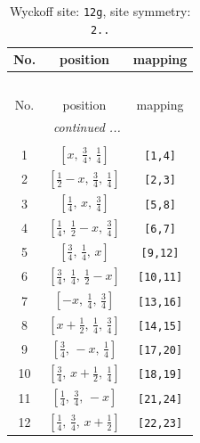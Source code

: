 \documentclass[fleqn,8pt]{jsarticle}
\begin{document}
\begin{longtable}{ccc}
\caption{Wyckoff site: {\tt 12g}, site symmetry: {\tt 2..}}
 \\
 \hline \hline
No. & position & mapping \\ \hline \endfirsthead

\multicolumn{2}{l}{\tablename\ \thetable{}} \\
 \hline \hline
No. & position & mapping \\ \hline \endhead

 \hline \hline
\multicolumn{2}{r}{\footnotesize\it continued ...} \\ \endfoot

 \hline \hline
\multicolumn{2}{r}{} \\ \endlastfoot

1 & $\left[ x,\, \frac{3}{4},\, \frac{1}{4} \right]$ & {\tt [1,4]} \\ \hline
2 & $\left[ \frac{1}{2} - x,\, \frac{3}{4},\, \frac{1}{4} \right]$ & {\tt [2,3]} \\ \hline
3 & $\left[ \frac{1}{4},\, x,\, \frac{3}{4} \right]$ & {\tt [5,8]} \\ \hline
4 & $\left[ \frac{1}{4},\, \frac{1}{2} - x,\, \frac{3}{4} \right]$ & {\tt [6,7]} \\ \hline
5 & $\left[ \frac{3}{4},\, \frac{1}{4},\, x \right]$ & {\tt [9,12]} \\ \hline
6 & $\left[ \frac{3}{4},\, \frac{1}{4},\, \frac{1}{2} - x \right]$ & {\tt [10,11]} \\ \hline
7 & $\left[ - x,\, \frac{1}{4},\, \frac{3}{4} \right]$ & {\tt [13,16]} \\ \hline
8 & $\left[ x + \frac{1}{2},\, \frac{1}{4},\, \frac{3}{4} \right]$ & {\tt [14,15]} \\ \hline
9 & $\left[ \frac{3}{4},\, - x,\, \frac{1}{4} \right]$ & {\tt [17,20]} \\ \hline
10 & $\left[ \frac{3}{4},\, x + \frac{1}{2},\, \frac{1}{4} \right]$ & {\tt [18,19]} \\ \hline
11 & $\left[ \frac{1}{4},\, \frac{3}{4},\, - x \right]$ & {\tt [21,24]} \\ \hline
12 & $\left[ \frac{1}{4},\, \frac{3}{4},\, x + \frac{1}{2} \right]$ & {\tt [22,23]} \\
\end{longtable}
\renewcommand{\arraystretch}{1.2}
\end{document}
